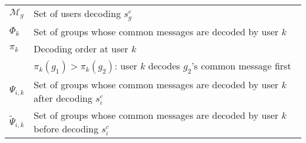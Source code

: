 \documentclass[12pt,draftcls,onecolumn]{IEEEtran}
\theoremstyle{remark}
\theoremstyle{definition}
\begin{document}
\begin{table}[b]
\begin{tabular}{|L{0.10\textwidth}|L{0.7\textwidth}|}
		$\mathcal{M}_g$ & Set of users decoding $s_g^c$\\
		$\Phi_{k}$ & Set of groups whose common messages are decoded by user $k$\\
		$\pi_{k}$ & Decoding order at user $k$\\
		& $\pi_{k}(g_1)>\pi_{k}(g_2)$: user $k$ decodes $g_2$'s common message first\\
		$\Psi_{i,k}$ & Set of groups whose common messages are decoded by user $k$ after decoding $s_i^c$\\
		$\tilde{\Psi}_{i,k}$ & Set of groups whose common messages are decoded by user $k$ before decoding $s_i^c$\\
		\hline

\end{tabular}
\end{table}
\end{document}
